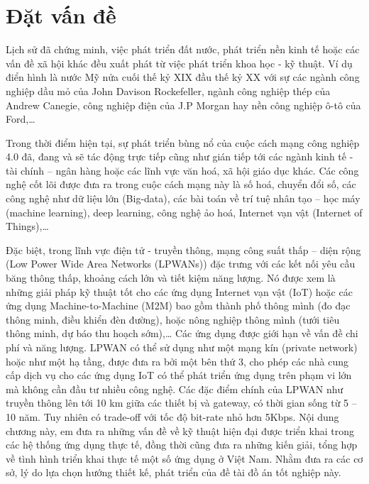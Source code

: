 \chapter{Đặt vấn đề}
Lịch sử đã chứng minh, việc phát triển đất nước, phát triển nền kinh tế hoặc các vấn đề xã hội khác đều xuất phát từ việc phát triển khoa học - kỹ thuật. Ví dụ điển hình là nước Mỹ nửa cuối thế kỷ XIX đầu thế kỷ XX với sự các ngành công nghiệp dầu mỏ của John Davison Rockefeller, ngành công nghiệp thép của Andrew Canegie, công nghiệp điện của J.P Morgan hay nền công nghiệp ô-tô của Ford,… \par
	Trong thời điểm hiện tại, sự phát triển bùng nổ của cuộc cách mạng công nghiệp 4.0 đã, đang và sẽ tác động trực tiếp cũng như gián tiếp tới các ngành kinh tế - tài chính – ngân hàng hoặc các lĩnh vực văn hoá, xã hội giáo dục khác. Các công nghệ cốt lõi được đưa ra trong cuộc cách mạng này là số hoá, chuyển đổi số, các công nghệ như dữ liệu lớn (Big-data), các bài toán về trí tuệ nhân tạo – học máy (machine learning), deep learning, công nghệ ảo hoá, Internet vạn vật (Internet of Things),… \par 
Đặc biệt, trong lĩnh vực điện tử - truyền thông, mạng công suất thấp – diện rộng (Low Power Wide Area Networks (LPWANs)) đặc trưng với các kết nối yêu cầu băng thông thấp, khoảng cách lớn và tiết kiệm năng lượng. Nó được xem là những giải pháp kỹ thuật tốt cho các ứng dụng Internet vạn vật (IoT) hoặc các ứng dụng Machine-to-Machine (M2M) bao gồm thành phố thông mình (đo đạc thông minh, điều khiển đèn đường), hoặc nông nghiệp thông mình (tưới tiêu thông minh, dự báo thu hoạch sớm),… Các ứng dụng được giới hạn về vấn đề chi phí và năng lượng. LPWAN có thể sử dụng như một mạng kín (private network) hoặc như một hạ tầng, được đưa ra bởi một bên thứ 3, cho phép các nhà cung cấp dịch vụ cho các ứng dụng IoT có thể phát triển ứng dụng trên phạm vi lớn mà không cần đầu tư nhiều công nghệ. Các đặc điểm chính của LPWAN như truyền thông lên tới 10 km giữa các thiết bị và gateway, có thời gian sống từ 5 – 10 năm. Tuy nhiên có trade-off với tốc độ bit-rate nhỏ hơn 5Kbps. Nội dung chương này, em đưa ra những vấn đề về kỹ thuật hiện đại được triển khai trong các hệ thống ứng dụng thực tế, đồng thời cũng đưa ra những kiến giải, tổng hợp về tình hình triển khai thực tế một số ứng dụng ở Việt Nam. Nhằm đưa ra các cơ sở, lý do lựa chọn hướng thiết kế, phát triển của đề tài đồ án tốt nghiệp này.

